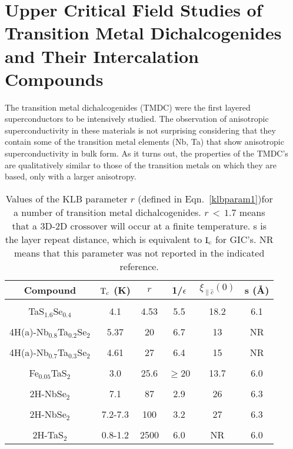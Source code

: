 \section{Upper Critical Field Studies of Transition Metal Dichalcogenides 
            and Their Intercalation Compounds}
\label{tmdc}

	The transition metal dichalcogenides (TMDC) were the  first layered
superconductors to be intensively studied.   The observation of anisotropic
superconductivity in these  materials  is  not surprising considering  that
they contain some   of the transition   metal elements (Nb, Ta)  that  show
anisotropic   superconductivity   in  bulk form.   As  it   turns out,  the
properties  of the  TMDC's  are   qualitatively  similar  to those  of  the
transition metals on which they are based, only with a larger anisotropy.

\begin{table}
\caption[Values of the KLB parameter $r$ for a number of
transition metal dichalcogenides.]{Values of the KLB parameter $r$ (defined
in Eqn.~\ref{klbparam1})for a  number of  transition metal dichalcogenides.
$r \,  < \,  1.7$ means that   a 3D-2D  crossover  will  occur at  a finite
temperature.  s is the layer repeat distance,  which is equivalent  to $\rm
I_c$   for GIC's. NR  means that  this parameter   was not reported  in the
indicated reference.}
\label{tmdcklb}
\begin{center}
\begin{tabular}{|c|ccccc|}
\hline
Compound & $\rm T_c$ (K) & $r$ & 1/$\epsilon$ & $\xi_{\parallel \hat{c}}(0)$ & s (\AA) \\
\hline
& & & & & \\
TaS$_{1.6}$Se$_{0.4}$\cite{prober80}& 4.1 & 4.53& 5.5& 18.2& 6.1\\
& & & & & \\
4H(a)-Nb$_{0.8}$Ta$_{0.2}$Se$_2$\cite{ikebe80}& 5.37 &  20& 6.7& 13& NR \\
& & & & & \\
4H(a)-Nb$_{0.7}$Ta$_{0.3}$Se$_2$\cite{ikebe80}& 4.61 &  27& 6.4& 15& NR \\
& & & & & \\
Fe$_{0.05}$TaS$_2$\cite{coleman83}& 3.0 & 25.6 & $\geq$20 & 13.7 & 6.0 \\
& & & & & \\
2H-NbSe$_2$\cite{prober80}& 7.1 & 87& 2.9& 26 & 6.3 \\
& & & & & \\
2H-NbSe$_2$\cite{toyota76}& 7.2-7.3 & 100& 3.2& 27 & 6.3\\
& & & & & \\
2H-TaS$_2$\cite{muto78,coleman83}& 0.8-1.2 & 2500& 6.0 & NR  &6.0 \\
\hline
\end{tabular}
\end{center}
\end{table}

